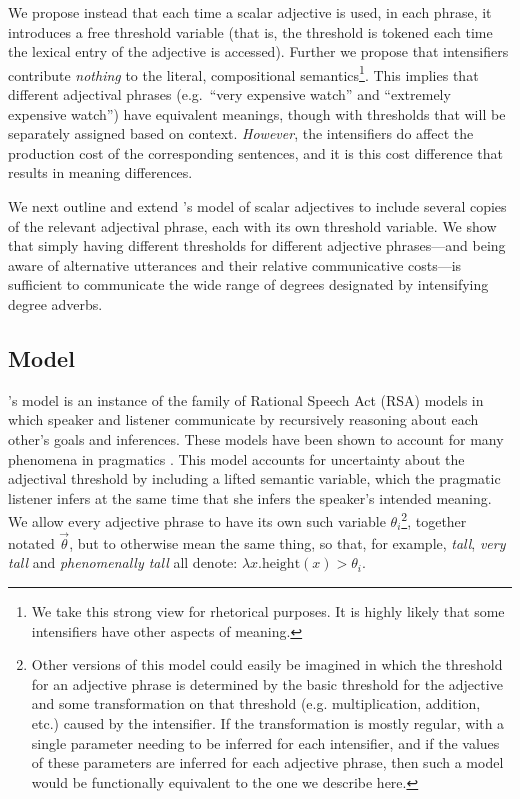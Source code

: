 \documentclass[10pt,letterpaper]{article}
\newcommand{\w}[1]{\emph{#1}}
\begin{document}
We propose instead that each time a scalar adjective is used, in each phrase, it introduces a free threshold variable (that is, the threshold is tokened each time the lexical entry of the adjective is accessed). Further we propose that intensifiers contribute \emph{nothing} to the literal, compositional semantics\footnote{We take this strong view for rhetorical purposes. It is highly likely that some intensifiers have other aspects of meaning.}. This implies that different adjectival phrases (e.g.~``very expensive watch'' and ``extremely expensive watch'') have equivalent meanings, though with thresholds that will be separately assigned based on context. \emph{However}, the intensifiers do affect the production cost of the corresponding sentences, and it is this cost difference that results in meaning differences.


We next outline and extend 's model of scalar adjectives to include several copies of the relevant adjectival phrase, each with its own threshold variable.
We show that simply having different thresholds for different adjective phrases---and being aware of alternative utterances and their relative communicative costs---is sufficient to communicate the wide range of degrees designated by intensifying degree adverbs.

\subsection{Model}

's model is an instance of the family of Rational Speech Act (RSA) models in which speaker and listener communicate by recursively reasoning about each other's goals and inferences. These models have been shown to account for many phenomena in pragmatics \cite{knowledge, games}. This model accounts for uncertainty about the adjectival threshold by including a lifted semantic variable, which the pragmatic listener infers at the same time that she infers the speaker's intended meaning. 
We allow every adjective phrase to have its own such variable $\theta_i$\footnote{Other versions of this model could easily be imagined in which the threshold for an adjective phrase is determined by the basic threshold for the adjective and some transformation on that threshold (e.g. multiplication, addition, etc.) caused by the intensifier. If the transformation is mostly regular, with a single parameter needing to be inferred for each intensifier, and if the values of these parameters are inferred for each adjective phrase, then such a model would be functionally equivalent to the one we describe here.}, together notated $\vec{\theta}$, but to otherwise mean the same thing, so that, for example, \w{tall}, \w{very tall} and \w{phenomenally tall} all denote: $\lambda x . \text{height}(x) > \theta_i$.
\end{document}
